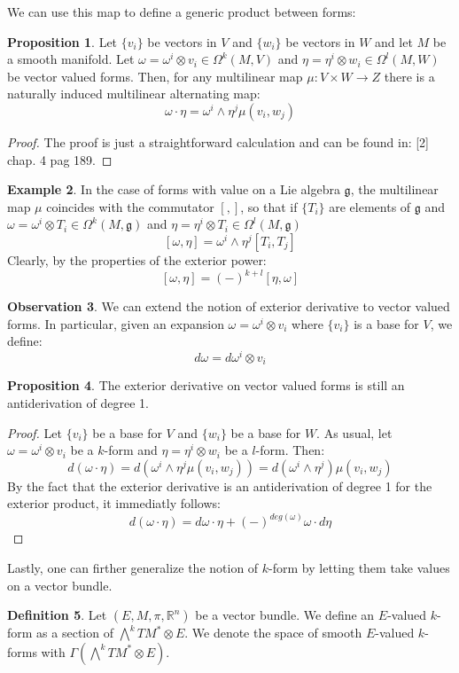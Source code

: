 \documentclass[12pt,a4paper]{report}
\theoremstyle{definition}
\newtheorem{Def}{Definition}[chapter]
\theoremstyle{Theorem}
\newtheorem{Prop}[Def]{Proposition}
\theoremstyle{definition}
\newtheorem{Ex}[Def]{Example}
\theoremstyle{definition}
\newtheorem{Obs}[Def]{Observation}
\begin{document}
	We can use this map to define a generic product between forms:
	\begin{Prop}
		Let $\{v_i\}$ be vectors in $V$ and $\{w_i\}$ be vectors in $W$ and let $M$ be a smooth manifold. Let $\omega=\omega^i\otimes v_i\in\Omega^k(M,V)$ and $\eta=\eta^i\otimes w_i\in\Omega^l(M,W)$ be vector valued forms. Then, for any multilinear map $\mu:V\times W\rightarrow Z$ there is a naturally induced multilinear alternating map:
		$$\omega\cdot \eta=\omega^i\wedge\eta^j \mu(v_i,w_j)$$
	\end{Prop}
	\begin{proof}
		The proof is just a straightforward calculation and can be found in: [2] chap. 4 pag 189.
	\end{proof}
	\begin{Ex}
		In the case of forms with value on a Lie algebra $\mathfrak{g}$, the multilinear map $\mu$ coincides with the commutator $[,]$, so that if $\{T_i\}$ are elements of $\mathfrak{g}$ and $\omega=\omega^i\otimes T_i\in\Omega^k(M,\mathfrak{g})$ and $\eta=\eta^i\otimes T_i\in\Omega^l(M,\mathfrak{g})$
		$$[\omega,\eta]=\omega^i\wedge\eta^j[T_i,T_j]$$
		Clearly, by the properties of the exterior power:
		$$[\omega,\eta]=(-)^{k+l}[\eta,\omega]$$
	\end{Ex}
	\begin{Obs}
		We can extend the notion of exterior derivative to vector valued forms. In particular, given an expansion $\omega=\omega^i\otimes v_i$ where $\{v_i\}$ is a base for $V$, we define:
		$$d\omega=d\omega^i\otimes v_i$$
	\end{Obs}
	\begin{Prop}
		The exterior derivative on vector valued forms is still an antiderivation of degree 1.
	\end{Prop}
	\begin{proof}
		Let $\{v_i\}$ be a base for $V$ and $\{w_i\}$ be a base for $W$. As usual, let $\omega=\omega^i\otimes v_i$ be a $k$-form and $\eta=\eta^i\otimes w_i$ be a $l$-form. Then:
		$$d(\omega\cdot \eta)=d(\omega^i\wedge\eta^j\mu(v_i,w_j))=d(\omega^i\wedge\eta^j)\mu(v_i,w_j)$$
		By the fact that the exterior derivative is an antiderivation of degree 1 for the exterior product, it immediatly follows:
		$$d(\omega\cdot \eta)=d\omega\cdot \eta+(-)^{deg(\omega)}\omega\cdot d\eta$$
	\end{proof}
	Lastly, one can firther generalize the notion of $k$-form by letting them take values on a vector bundle.
	\begin{Def}
		Let $(E,M,\pi, \mathbb{R}^n)$ be a vector bundle. We define an $E$-valued $k$-form as a section of $\bigwedge^kTM^*\otimes E$. We denote the space of smooth $E$-valued $k$-forms with $\Gamma(\bigwedge^kTM^*\otimes E)$.
	\end{Def}
\end{document}
